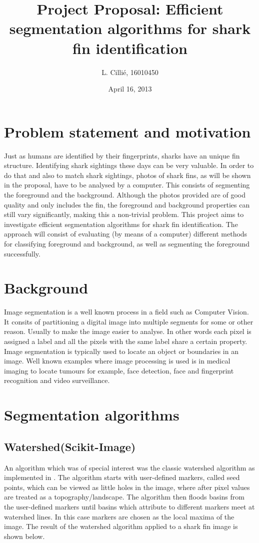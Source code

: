 \documentclass[a4paper,10pt]{article}
\title{Project Proposal: Efficient segmentation algorithms for shark fin identification}
\author{L. Cilli\'{e}, 16010450}
\date{April 16, 2013}
\begin{document}
\maketitle
\lstset{language=Matlab}

\newpage
\tableofcontents
\newpage

\section{Problem statement and motivation}  
Just as humans are identified by their fingerprints, sharks have an unique fin structure.  Identifying shark sightings these days can be very valuable.  In order to do that and also to match shark sightings, photos of shark fins, as will be shown in the proposal, have to be analysed by a computer.  This consists of segmenting the foreground and the background.  Although the photos provided are of good quality and only includes the fin, the foreground and background properties can still vary significantly, making this a non-trivial problem.  This project aims to investigate efficient segmentation algorithms for shark fin identification.  The approach will consist of evaluating (by means of a computer) different methods for classifying foreground and background, as well as segmenting the foreground successfully.  


\section{Background}
Image segmentation is a well known process in a field such as Computer Vision.  It consits of partitioning a digital image into multiple segments for some or other reason.  Usually to make the image easier to analyse.  In other words each pixel is assigned a label and all the pixels with the same label share a certain property.  Image segmentation is typically used to locate an object or boundaries in an image.  Well known examples where image processing is used is in medical imaging to locate tumours for example, face detection, face and fingerprint recognition and video surveillance.


\section{Segmentation algorithms}
\subsection{Watershed(Scikit-Image)}
An algorithm which was of special interest was the classic watershed algorithm as implemented in \cite{scikit}.  The algorithm starts with user-defined markers, called seed points, which can be viewed as little holes in the image, where after pixel values are treated as a topography/landscape.  The algorithm then floods basins from the user-defined markers until basins which attribute to different markers meet at watershed lines.  In this case markers are chosen as the local maxima of the image.  The result of the watershed algorithm applied to a shark fin image is shown below.
\end{document}
